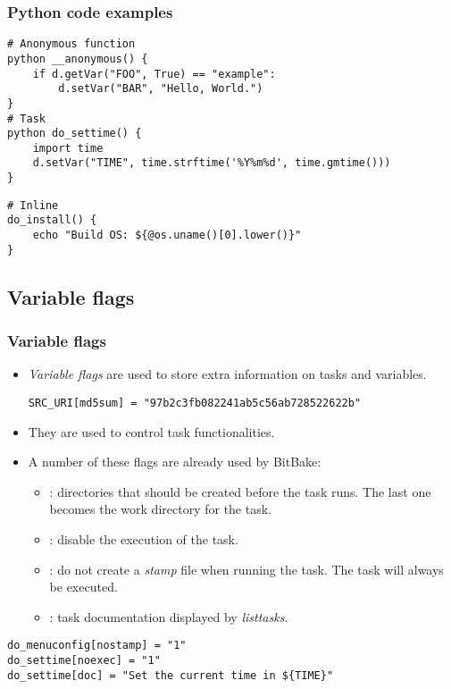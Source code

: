 \begin{frame}[fragile]
  \frametitle{Python code examples}
  \begin{verbatim}
# Anonymous function
python __anonymous() {
    if d.getVar("FOO", True) == "example":
        d.setVar("BAR", "Hello, World.")
}
# Task
python do_settime() {
    import time
    d.setVar("TIME", time.strftime('%Y%m%d', time.gmtime()))
}
  \end{verbatim}
  \begin{verbatim}
# Inline
do_install() {
    echo "Build OS: ${@os.uname()[0].lower()}"
}

  \end{verbatim}
\end{frame}

\subsection{Variable flags}

\begin{frame}[fragile]
  \frametitle{Variable flags}
  \begin{itemize}
    \item {\em Variable flags} are used to store extra information on
      tasks and variables.
  \begin{verbatim}
SRC_URI[md5sum] = "97b2c3fb082241ab5c56ab728522622b"
  \end{verbatim}
    \item They are used to control task functionalities.
    \item A number of these flags are already used by BitBake:
      \begin{itemize}
        \item {}: directories that should be created before the
          task runs. The last one becomes the work directory for the
          task.
        \item {}: disable the execution of the task.
        \item {}: do not create a {\em stamp} file when
          running the task. The task will always be executed.
        \item {}: task documentation displayed by {\em
          listtasks}.
      \end{itemize}
  \end{itemize}
  \begin{verbatim}
do_menuconfig[nostamp] = "1"
do_settime[noexec] = "1"
do_settime[doc] = "Set the current time in ${TIME}"
  \end{verbatim}
\end{frame}

